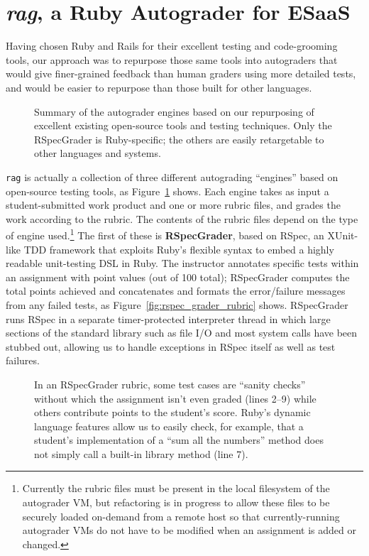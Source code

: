 \section{\emph{rag}, a Ruby Autograder for ESaaS}

Having chosen Ruby and Rails for their excellent testing and
code-grooming tools, our approach was to repurpose those same tools into
autograders that would give finer-grained feedback than human graders
using more detailed tests, and would be easier to repurpose than
those built for other languages.

\begin{figure}
  
  \caption{\label{fig:grader_summary} Summary of the autograder
    engines based on our repurposing of excellent existing open-source
    tools and testing techniques.  Only the RSpecGrader is
    Ruby-specific; the others are easily retargetable to other languages
    and systems.}
\end{figure}

\texttt{rag} 
is actually a collection of three different autograding
``engines'' based on open-source testing
tools, as Figure~\ref{fig:grader_summary} shows.  
Each engine takes as input a student-submitted work
product and one or more rubric files, and grades the work according to
the rubric.  The contents of the rubric files depend on the type of
engine used.\footnote{Currently the rubric files must be present in the
  local filesystem of the autograder VM, but refactoring is in progress
  to allow these files to be securely loaded on-demand from a remote
  host so that currently-running 
  autograder VMs do not have to be modified when an assignment is added
  or changed.}
The first of these is
\textbf{RSpecGrader}, based on RSpec, an XUnit-like 
TDD framework that exploits Ruby's
flexible syntax to embed a highly readable unit-testing DSL in Ruby.
The instructor annotates specific tests within an assignment with point
values (out of 100 total); RSpecGrader computes the total points
achieved and concatenates and formats the error/failure messages from
any failed tests, as Figure~\ref{fig:rspec_grader_rubric} shows.
RSpecGrader  runs RSpec in a separate timer-protected interpreter
thread in which large sections of the
standard library such as file I/O and most system calls have been
stubbed out, allowing us to handle exceptions in RSpec itself as well
as test failures.  

\begin{figure}
  \centering
    
  \caption{\label{fig:rspec-grader-rubric}
    In an RSpecGrader rubric, some test cases are ``sanity checks''
    without which the assignment isn't even graded
    (lines 2--9) while others contribute points to the
    student's score.  Ruby's dynamic language features allow us to
    easily check, for example, that
a student's implementation of a ``sum all the numbers'' method does not
simply call a built-in library method (line 7).
  }
\end{figure}

